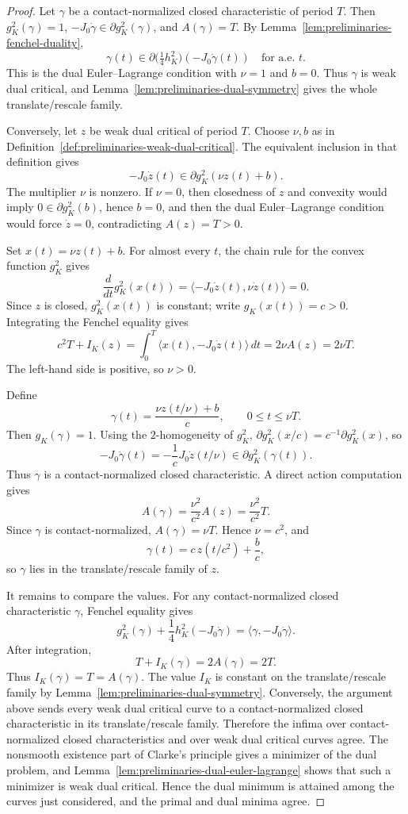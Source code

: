 \begin{proof}
Let \(\gamma\) be a contact-normalized closed characteristic of period \(T\).
Then \(g_K^2(\gamma)=1\),
\(-J_0\dot{\gamma}\in\partial g_K^2(\gamma)\), and \(A(\gamma)=T\). By
Lemma~\ref{lem:preliminaries-fenchel-duality},
\[
  \gamma(t)\in
  \partial\bigl(\tfrac{1}{4}h_K^2\bigr)(-J_0\dot{\gamma}(t))
  \quad\text{for a.e. }t.
\]
This is the dual Euler--Lagrange condition with \(\nu=1\) and \(b=0\).
Thus \(\gamma\) is weak dual critical, and
Lemma~\ref{lem:preliminaries-dual-symmetry} gives the whole
translate/rescale family.

Conversely, let \(z\) be weak dual critical of period \(T\). Choose
\(\nu,b\) as in Definition~\ref{def:preliminaries-weak-dual-critical}. The
equivalent inclusion in that definition gives
\[
  -J_0\dot{z}(t)\in\partial g_K^2(\nu z(t)+b).
\]
The multiplier \(\nu\) is nonzero. If \(\nu=0\), then closedness of \(z\) and
convexity would imply \(0\in\partial g_K^2(b)\), hence \(b=0\), and then the
dual Euler--Lagrange condition would force \(\dot{z}=0\), contradicting
\(A(z)=T>0\).

Set \(x(t)=\nu z(t)+b\). For almost every \(t\), the chain rule for the convex
function \(g_K^2\) gives
\[
  \frac{d}{dt}g_K^2(x(t))
  = \langle -J_0\dot{z}(t),\nu\dot{z}(t)\rangle
  =0.
\]
Since \(z\) is closed, \(g_K^2(x(t))\) is constant; write
\(g_K(x(t))=c>0\). Integrating the Fenchel equality gives
\[
  c^2T+I_K(z)
  =\int_0^T\langle x(t),-J_0\dot{z}(t)\rangle\,dt
  =2\nu A(z)=2\nu T.
\]
The left-hand side is positive, so \(\nu>0\).

Define
\[
  \gamma(t)=\frac{\nu z(t/\nu)+b}{c},
  \qquad 0\leq t\leq \nu T.
\]
Then \(g_K(\gamma)=1\). Using the \(2\)-homogeneity of \(g_K^2\),
\(\partial g_K^2(x/c)=c^{-1}\partial g_K^2(x)\), so
\[
  -J_0\dot{\gamma}(t)
  =-\frac{1}{c}J_0\dot{z}(t/\nu)
  \in \partial g_K^2(\gamma(t)).
\]
Thus \(\gamma\) is a contact-normalized closed characteristic. A direct action
computation gives
\[
  A(\gamma)=\frac{\nu^2}{c^2}A(z)=\frac{\nu^2}{c^2}T.
\]
Since \(\gamma\) is contact-normalized, \(A(\gamma)=\nu T\). Hence
\(\nu=c^2\), and
\[
  \gamma(t)=c\,z(t/c^2)+\frac{b}{c},
\]
so \(\gamma\) lies in the translate/rescale family of \(z\).

It remains to compare the values. For any contact-normalized closed
characteristic \(\gamma\), Fenchel equality gives
\[
  g_K^2(\gamma)+\frac{1}{4}h_K^2(-J_0\dot{\gamma})
  =\langle \gamma,-J_0\dot{\gamma}\rangle.
\]
After integration,
\[
  T+I_K(\gamma)=2A(\gamma)=2T.
\]
Thus \(I_K(\gamma)=T=A(\gamma)\). The value \(I_K\) is constant on the
translate/rescale family by Lemma~\ref{lem:preliminaries-dual-symmetry}.
Conversely, the argument above sends every weak dual critical curve to a
contact-normalized closed characteristic in its translate/rescale family.
Therefore the infima over contact-normalized closed characteristics and over
weak dual critical curves agree. The nonsmooth existence part of Clarke's
principle gives a minimizer of the dual problem, and
Lemma~\ref{lem:preliminaries-dual-euler-lagrange} shows that such a minimizer
is weak dual critical. Hence the dual minimum is attained among the curves just
considered, and the primal and dual minima agree.
\end{proof}

